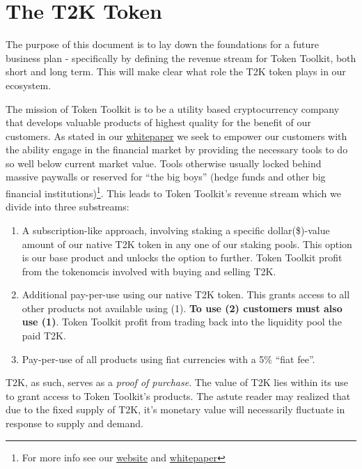\documentclass[11pt]{article}
\author{Andreas Munk}
\date{\today}
\title{}
\begin{document}
\begin{figure}[t]
\centering

\end{figure}

\section*{The T2K Token}
\label{sec:orgc938672}

The purpose of this document is to lay down the foundations for a future
business plan - specifically by defining the revenue stream for Token Toolkit,
both short and long term. This will make clear what role the T2K token plays in
our ecosystem.

The mission of Token Toolkit is to be a utility based cryptocurrency company
that develops valuable products of highest quality for the benefit of our
customers. As stated in our \href{https://docs.tokentoolkit.io/welcome/what-is-token-toolkit}{whitepaper} we seek to empower our customers with the
ability engage in the financial market by providing the necessary tools to do so
well below current market value. Tools otherwise usually locked behind massive
paywalls or reserved for ``the big boys'' (hedge funds and other big financial
institutions)\footnote{For more info see our \href{https://tokentoolkit.io/\#}{website} and \href{https://docs.tokentoolkit.io/welcome/what-is-token-toolkit}{whitepaper}}. This leads to Token Toolkit's revenue stream which we
divide into three substreams:

\begin{enumerate}
\item A subscription-like approach, involving staking a specific dollar(\$)-value
amount of our native T2K token in any one of our staking pools. This option
is our base product and unlocks the option to further. Token Toolkit profit
from the tokenomcis involved with buying and selling T2K.
\item Additional pay-per-use using our native T2K token. This grants access to all
other products not available using (1). \textbf{To use (2) customers must also use
(1)}. Token Toolkit profit from trading back into the liquidity pool the
paid T2K.
\item Pay-per-use of all products using fiat currencies with a 5\% ``fiat fee''.
\end{enumerate}

T2K, as such, serves as a \emph{proof of purchase}. The value of T2K lies within its
use to grant access to Token Toolkit's products. The astute reader may realized
that due to the fixed supply of T2K, it's monetary value will necessarily
fluctuate in response to supply and demand.
\end{document}
